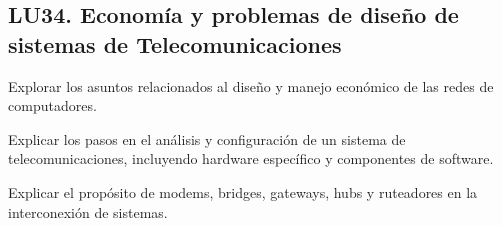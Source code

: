 \subsection{LU34. Economía y problemas de diseño de sistemas de Telecomunicaciones}\label{sec:LU34}
\begin{LearningUnit}
\begin{LUGoal}
\item Explorar los asuntos relacionados al diseño y manejo económico de las redes de computadores.
\end{LUGoal}

\begin{LUObjective}
\item Explicar los pasos en el análisis y configuración de un sistema de telecomunicaciones, incluyendo hardware específico y componentes de software.
\item Explicar el propósito de modems, bridges, gateways, hubs y ruteadores en la interconexión de sistemas.
\end{LUObjective}
\end{LearningUnit}

